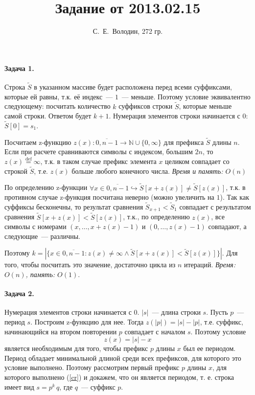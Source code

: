 \documentclass{article}
\title{Задание от 2013.02.15}
\author{С.~Е.~Володин, 272 гр.}
\date{}
\begin{document}
\maketitle
\paragraph{Задача 1.} Строка $\tilde{S}$ в указанном массиве будет расположена перед всеми суффиксами, которые ей равны, т.к. её индекс~--- $1$~--- меньше. Поэтому условие эквивалентно следующему: посчитать количество $k$ суффиксов строки $\tilde{S}$, которые меньше самой строки. Ответом будет $k+1$. Нумерация элементов строки начинается с $0$: $\tilde{S}[0]=s_1$.

Посчитаем z-функцию \begin{math}z(x):\overline{0,n-1}\rightarrow\mathbb{N}\cup\{0,\infty\}\end{math} для префикса $\tilde{S}$ длины $n$. Если при расчете сравниваются символы с индексом, большим $2n$, то $z(x)\stackrel{\mathrm{def}}{=}\infty$, т.к. в таком случае префикс элемента $x$ целиком совпадает со строкой $\tilde{S}$, т.е.  $z(x)$ больше любого конечного числа. {\em Время и память: $O(n)$}

По определению z-функции $\forall x\in\overline{0,n-1}\hookrightarrow\tilde{S}[x+z(x)]\neq\tilde{S}[z(x)]$, т.к. в противном случае z-функция посчитана неверно (можно увеличить на $1$). Так как суффиксы бесконечны, то результат сравнения $\tilde{S}_{x+1}<\tilde{S}_1$ совпадает с результатом сравнения $\tilde{S}[x+z(x)]<\tilde{S}[z(x)]$, т.к., по определению $z(x)$, все символы с номерами $(x,\dots,x+z(x)-1)$ и $(0,\dots,z(x)-1)$ совпадают, а следующие~--- различны.

Поэтому $k=|\{x\in\overline{0,n-1}:z(x)\neq\infty\wedge\tilde{S}[x+z(x)]<\tilde{S}[z(x)]\}|$. Для того, чтобы посчитать это значение, достаточно цикла из $n$ итераций. {\em Время: $O(n)$, память: $O(1)$}.
\paragraph{Задача 2.} Нумерация элементов строки начинается с $0$. $|s|$~--- длина строки $s$. Пусть $p$~--- период $s$. Построим z-функцию для нее. Тогда $z(|p|)=|s|-|p|$, т.е. суффикс, начинающийся на втором повторении $p$ совпадает с началом $s$.
Поэтому условие \begin{equation}\label{cr}z(x)=|s|-x\end{equation} является необходимым для того, чтобы префикс $p$ длины $x$ был ее периодом. Период обладает минимальной длиной среди всех префиксов, для которого это условие выполнено. Поэтому рассмотрим первый префикс $p$ длины $x$, для которого выполнено (\ref{cr}) и докажем, что он является периодом, т. е. строка имеет вид $s=p^k\,q$, где $q$~--- суффикс $p$.
\end{document}
